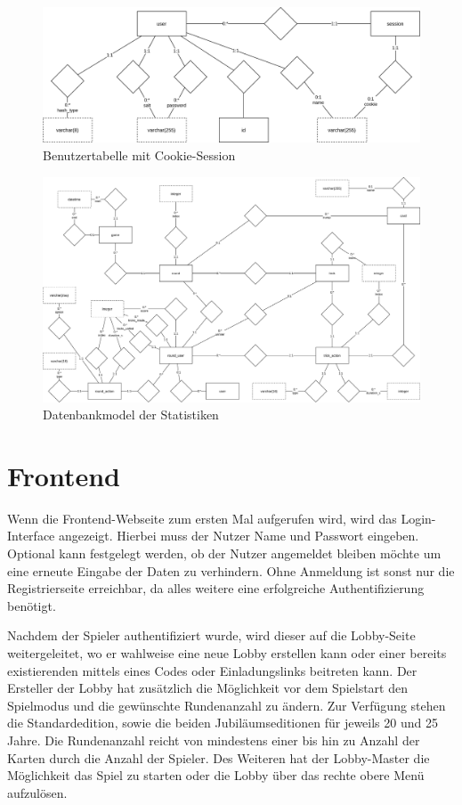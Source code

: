 \begin{figure}[h]
	\includegraphics[width=\textwidth]{images/user-db.png}
	\caption{Benutzertabelle mit Cookie-Session}
	\label{fig:user-db}
\end{figure}

\begin{figure}
	\includegraphics[width=\textheight]{images/statistics-db.png}
	\caption{Datenbankmodel der Statistiken}
	\label{fig:statistics-db}
\end{figure}

\section{Frontend}
Wenn die Frontend-Webseite zum ersten Mal aufgerufen wird, wird das Login-Interface angezeigt. Hierbei muss der Nutzer Name und Passwort eingeben. Optional kann festgelegt werden, ob der Nutzer angemeldet bleiben möchte um eine erneute Eingabe der Daten zu verhindern. Ohne Anmeldung ist sonst nur die Registrierseite erreichbar, da alles weitere eine erfolgreiche Authentifizierung benötigt.

Nachdem der Spieler authentifiziert wurde, wird dieser auf die Lobby-Seite weitergeleitet, wo er wahlweise eine neue Lobby erstellen kann oder einer bereits existierenden mittels eines Codes oder Einladungslinks beitreten kann. Der Ersteller der Lobby hat zusätzlich die Möglichkeit vor dem Spielstart den Spielmodus und die gewünschte Rundenanzahl zu ändern. Zur Verfügung stehen die Standardedition, sowie die beiden Jubiläumseditionen für jeweils 20 und 25 Jahre. Die Rundenanzahl reicht von mindestens einer bis hin zu Anzahl der Karten durch die Anzahl der Spieler. Des Weiteren hat der Lobby-Master die Möglichkeit das Spiel zu starten oder die Lobby über das rechte obere Menü aufzulösen.

